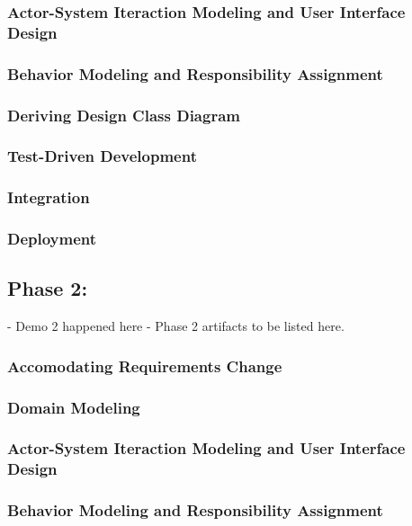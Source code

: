 \documentclass[11pt]{article}
\begin{document}
\subsubsection{Actor-System Iteraction Modeling and User Interface Design}
 
\subsubsection{Behavior Modeling and Responsibility Assignment}
 
\subsubsection{Deriving Design Class Diagram}
 
\subsubsection{Test-Driven Development}
 
\subsubsection{Integration}
 
\subsubsection{Deployment}

\subsection{Phase 2:} 
 - Demo 2 happened here
 - Phase 2 artifacts to be listed here.

\subsubsection{Accomodating Requirements Change}
 
\subsubsection{Domain Modeling}
  
\subsubsection{Actor-System Iteraction Modeling and User Interface Design}
  
\subsubsection{Behavior Modeling and Responsibility Assignment}
  
\end{document}
